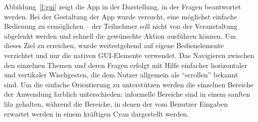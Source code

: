 Abbildung~\ref{f:gui} zeigt die App in der Darstellung, in der Fragen beantwortet werden. Bei der Gestaltung der App wurde versucht, eine möglichst einfache Bedienung zu ermöglichen -- der Teilnehmer soll nicht von der Veranstaltung abgelenkt werden und schnell die gewünschte Aktion ausführen können. Um dieses Ziel zu erreichen, wurde weitestgehend auf eigene Bedienelemente verzichtet und nur die nativen GUI-Elemente verwendet. Das Navigieren zwischen den einzelnen Themen und deren Fragen erfolgt mit Hilfe einfacher horizontaler und vertikaler Wischgesten, die dem Nutzer allgemein als "`scrollen"' bekannt sind. Um die einfache Orientierung zu unterstützen werden die einzelnen Bereiche der Anwendung farblich unterschieden: informelle Bereiche sind in einem sanften lila gehalten, während die Bereiche, in denen der vom Benutzer Eingaben erwartet werden in einem kräftigen Cyan dargestellt werden.